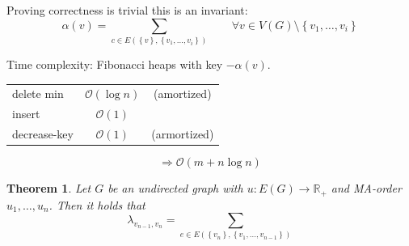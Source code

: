 \documentclass{article}
\newtheorem{theorem}{Theorem}
\newcommand{\set}[1]{\left\{#1\right\}}
\begin{document}
Proving correctness is trivial this is an invariant:
\[
  \alpha(v) = \sum_{c \in E(\set{v}, \set{v_1, \ldots, v_i})}
    \qquad \forall v \in V(G) \setminus \set{v_1, \ldots, v_i}
\]

Time complexity:
Fibonacci heaps with key $-\alpha(v)$.

\begin{center}
  \begin{tabular}{lcc}
    delete min   & $\mathcal{O}(\log{n})$ & (amortized) \\
    insert       & $\mathcal{O}(1)$       & \\
    decrease-key & $\mathcal{O}(1)$       & (armortized)
  \end{tabular}
  \[ \Rightarrow \mathcal{O}(m + n \log{n}) \]
\end{center}

\begin{theorem}\label{lemma-4.21}
  Let $G$ be an undirected graph with $u: E(G) \rightarrow \mathbb{R}_+$ and MA-order $u_1, \ldots, u_n$.
  Then it holds that
  \[
    \lambda_{v_{n-1}, v_n} = \sum_{e \in E(\set{v_n}, \set{v_1, \ldots, v_{n-1}})}
  \]
\end{theorem}
\end{document}

